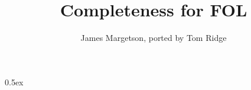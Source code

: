 \documentclass[11pt,a4paper]{article}
\begin{document}
\title{Completeness for FOL}
\author{James Margetson, ported by Tom Ridge}
\maketitle

\tableofcontents

\parindent 0pt\parskip 0.5ex


\end{document}
